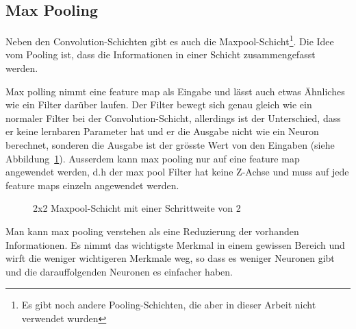 \documentclass[12pt,a4paper]{report}
\begin{document}
\subsection{Max Pooling}
Neben den Convolution-Schichten gibt es auch die Maxpool-Schicht\footnote{Es gibt noch andere Pooling-Schichten, die aber in dieser Arbeit nicht verwendet wurden}.
Die Idee vom Pooling ist, dass die Informationen in einer Schicht zusammengefasst werden.

Max polling nimmt eine feature map als Eingabe und lässt auch etwas Ähnliches wie ein Filter darüber laufen.
Der Filter bewegt sich genau gleich wie ein normaler Filter bei der Convolution-Schicht, allerdings ist der Unterschied, dass er keine lernbaren Parameter hat und
er die Ausgabe nicht wie ein Neuron berechnet, sonderen die Ausgabe ist der grösste Wert von den Eingaben (siehe Abbildung~\ref{fig:pool1}).
Ausserdem kann max pooling nur auf eine feature map angewendet werden,
d.h der max pool Filter hat keine Z-Achse und muss auf jede feature maps einzeln angewendet werden\cite{conv}.
\begin{figure}[!h]
    \centering
    \caption{2x2 Maxpool-Schicht mit einer Schrittweite von 2}
    \label{fig:pool1}
\end{figure}
Man kann max pooling verstehen als eine Reduzierung der vorhanden Informationen.
Es nimmt das wichtigste Merkmal in einem gewissen Bereich und wirft die weniger wichtigeren Merkmale weg,
so dass es weniger Neuronen gibt und die darauffolgenden Neuronen es einfacher haben.
\end{document}
